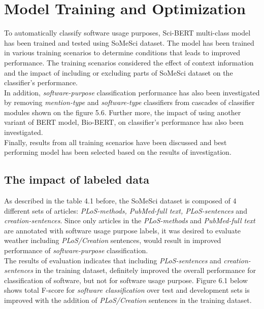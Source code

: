 \chapter{Model Training and Optimization}
\label{ch:chapter06}
 
%
%

To automatically classify software usage purposes, \ac{Sci-BERT} multi-class model has been trained and tested using \ac{SoMeSci} dataset. The model has been trained in various training scenarios to determine conditions that leads to improved performance. The training scenarios considered the effect of context information  and the impact of including or excluding parts of \ac{SoMeSci} dataset on the classifier’s performance.\\
 
In addition, \emph{software-purpose} classification performance has also been investigated by removing \emph{mention-type} and \emph{software-type} classifiers from cascades of classifier modules shown on the figure 5.6.  Further more, the impact of using another variant of BERT model, \ac{Bio-BERT}, on classifier’s performance  has also been investigated. \\

Finally, results from all training scenarios have been discussed and best performing model has been selected based on the results of investigation.

\section{The impact of labeled data}
\label{sec:chapter06:exclusion}

As described in the table 4.1 before, the \ac{SoMeSci} dataset is composed of 4 different sets of articles: \emph{PLoS-methods, PubMed-full text,  PLoS-sentences} and \emph{creation-sentences}. Since only articles in the  \emph{PLoS-methods} and \emph{PubMed-full text} are annotated with software usage purpose labels, it was desired to evaluate weather including \emph{PLoS/Creation} sentences, would result in improved performance of \emph{software-purpose} classification.  \\

The results of evaluation indicates that including \emph{ PLoS-sentences} and \emph{creation-sentences} in the training dataset, definitely improved the overall performance for classification of software, but not for software usage purpose. Figure 6.1 below shows total F-score for \emph{software classification} over test and development sets is improved with the addition of \emph{PLoS/Creation} sentences in the training dataset. \\

